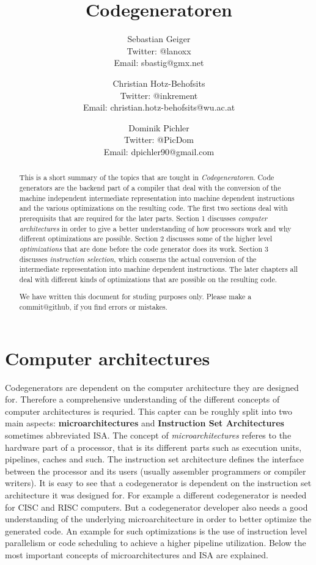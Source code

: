 \documentclass[a4paper,10pt]{article}
\title{Codegeneratoren}
\author{
Sebastian Geiger\\ \small{Twitter: @lanoxx} \\ \small{Email: sbastig@gmx.net}
\and
Christian Hotz-Behofsits\\ \small{Twitter: @inkrement} \\ \small{Email: christian.hotz-behofsits@wu.ac.at}
\and
Dominik Pichler\\ \small{Twitter: @PicDom} \\ \small{Email: dpichler90@gmail.com}
}
\begin{document}
\maketitle

\begin{abstract}
This is a short summary of the topics that are tought in \emph{Codegeneratoren}. Code generators are the backend part of a compiler
that deal with the conversion of the machine independent intermediate representation into machine dependent instructions and the various
optimizations on the resulting code. The first two sections deal with prerequisits that are required for the later parts. Section 1
discusses \emph{computer architectures} in order to give a better understanding of how processors work and why different optimizations
are possible. Section 2 discusses some of the higher level \emph{optimizations} that are done before the code generator does its work.
Section 3 discusses \emph{instruction selection}, which conserns the actual conversion of the intermediate representation into machine
dependent instructions. The later chapters all deal with different kinds of optimizations that are possible on the resulting code.

We have written this document for studing purposes only. Please make a commit@github, if you find errors or mistakes.
\end{abstract}

\tableofcontents

\section{Computer architectures}
Codegenerators are dependent on the computer architecture they are designed for. Therefore a comprehensive understanding of the different
concepts of computer architectures is requried. This capter can be roughly split into two main aspects: \textbf{microarchitectures} and
\textbf{Instruction Set Architectures} sometimes abbreviated ISA. The concept of \textit{microarchitectures} referes to the hardware part
of a processor, that is its different parts such as execution units, pipelines, caches and such. The instruction set architecture defines
the interface between the processor and its users (usually assembler programmers or compiler writers). It is easy to see that a
codegenerator is dependent on the instruction set architecture it was designed for. For example a different codegenerator is needed for
CISC and RISC computers. But a codegenerator developer also needs a good understanding of the underlying microarchitecture in order to
better optimize the generated code. An example for such optimizations is the use of instruction level parallelism or code scheduling to
achieve a higher pipeline utilization. Below the most important concepts of microarchitectures and ISA are explained.
\end{document}
